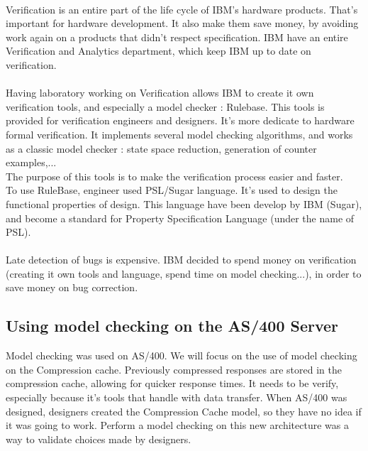 \documentclass[a4paper,12pt]{article} %
\begin{document}
\paragraph{}Verification is an entire part of the life cycle of IBM's hardware products. That's important for hardware development. It also make them save money, by avoiding work again on a products that didn't respect specification. IBM have an entire Verification and Analytics department, which keep IBM up to date on verification. 
\paragraph{}Having laboratory working on Verification allows IBM to create it own verification tools, and especially a model checker : Rulebase\cite{IBMd}. This tools is provided for verification engineers and designers. It's more dedicate to hardware formal verification. 
 It implements several model checking algorithms, and works as a classic model checker : state space reduction, generation of counter examples,...\\
The purpose of this tools is to make the verification process easier and faster. \\
To use RuleBase, engineer used PSL/Sugar language. It's used to design the functional properties of design. This language have been develop by IBM (Sugar), and become a standard for Property Specification Language (under the name of PSL).
\paragraph{} Late detection of bugs is expensive. IBM decided to spend money on verification (creating it own tools and language, spend time on model checking...), in order to save money on bug correction.

\subsection{Using model checking on the AS/400 Server}
Model checking was used on AS/400. We will focus on the use of model checking on the Compression cache. Previously compressed responses are stored in the compression cache, allowing for quicker response times. It needs to be verify, especially because it's tools that handle with data transfer. When AS/400 was designed, designers created the Compression Cache model, so they have no idea if it was going to work.  Perform a model checking on this new architecture was a way to validate choices made by designers.
\end{document}
